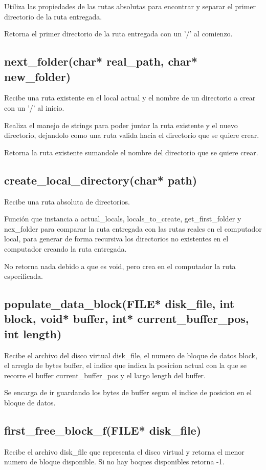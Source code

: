 \documentclass[12pt]{article}
\begin{document}
Utiliza las propiedades de las rutas absolutas para encontrar y separar el primer directorio de la ruta entregada.

Retorna el primer directorio de la ruta entregada con un '/' al comienzo.

\subsection{next\_folder(char* real\_path, char* new\_folder)}
Recibe una ruta existente en el local actual y el nombre de un directorio a crear con un '/' al inicio.

Realiza el manejo de strings para poder juntar la ruta existente y el nuevo directorio, dejandolo como una ruta valida hacia el directorio que se quiere crear. 

Retorna la ruta existente sumandole el nombre del directorio que se quiere crear.

\subsection{create\_local\_directory(char* path)}
Recibe una ruta absoluta de directorios.

Función que instancia a actual\_locals, locals\_to\_create, get\_first\_folder y nex\_folder para comparar la ruta entregada con las rutas reales en el computador local, para generar de forma recursiva los directorios no existentes en el computador creando la ruta entregada.

No retorna nada debido a que es void, pero crea en el computador la ruta especificada.

\subsection{populate\_data\_block(FILE* disk\_file, int block, void* buffer, int* current\_buffer\_pos, int length) }
Recibe el archivo del disco virtual disk\_file, el numero de bloque de datos block, el arreglo de bytes buffer, el indice que indica la posicion actual con la que se recorre el buffer current\_buffer\_pos y el largo length del buffer.

Se encarga de ir guardando los bytes de buffer segun el indice de posicion en el bloque de datos.

\subsection{first\_free\_block\_f(FILE* disk\_file)}
Recibe el archivo disk\_file que representa el disco virtual y retorna el menor numero de bloque disponible. Si no hay boques disponibles retorna -1.
\end{document}
